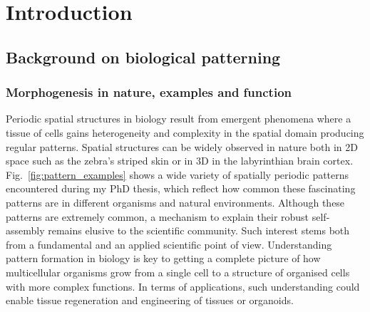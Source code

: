 \chapter{Introduction}\label{introduction}
\section{Background on biological patterning}
\subsection{Morphogenesis in nature, examples and function}
Periodic spatial structures in biology result from emergent phenomena where a tissue of cells gains heterogeneity and complexity in the spatial domain producing regular patterns.
Spatial structures can be widely observed in nature both in \acrfull{2D} space such as the zebra's striped skin or in \acrfull{3D} in the labyrinthian brain cortex.
Fig.~\ref{fig:pattern_examples} shows a wide variety of spatially periodic patterns encountered during my PhD thesis, which reflect how common these fascinating patterns are in different organisms and natural environments.
Although these patterns are extremely common, a mechanism to explain their robust self-assembly remains elusive to the scientific community.
Such interest stems both from a fundamental and an applied scientific point of view.
Understanding pattern formation in biology is key to getting a complete picture of how multicellular organisms grow from a single cell to a structure of organised cells with more complex functions.
In terms of applications, such understanding could enable tissue regeneration and engineering of tissues or organoids.

